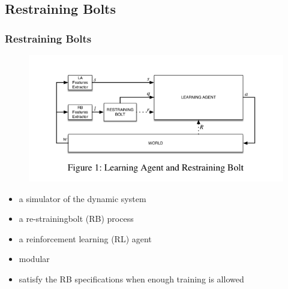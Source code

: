 \documentclass[kul]{kulakbeamer}
\begin{document}
\subsection{Restraining Bolts}
\begin{frame}
\frametitle{Restraining Bolts}
   \begin{figure}
    \centering
    \includegraphics[scale=0.6]{bolts.png}
    \end{figure}
    \begin{itemize}
        \item  a simulator of the dynamic system
        \item a re-strainingbolt (RB) process
        \item a reinforcement learning (RL) agent
        \item modular
         \item satisfy the RB specifications when enough training is allowed
    \end{itemize}

\end{frame}
\end{document}
